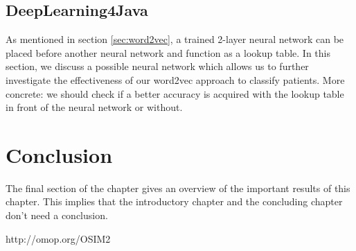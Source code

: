 \subsection{DeepLearning4Java}

As mentioned in section \ref{sec:word2vec}, a trained 2-layer neural network can be placed before another neural network and function as a lookup table. In this section, we discuss a possible neural network which allows us to further investigate the effectiveness of our word2vec approach to classify patients. More concrete: we should check if a better accuracy is acquired with the lookup table in front of the neural network or without. 



\section{Conclusion}
The final section of the chapter gives an overview of the important results
of this chapter. This implies that the introductory chapter and the
concluding chapter don't need a conclusion.


http://omop.org/OSIM2



